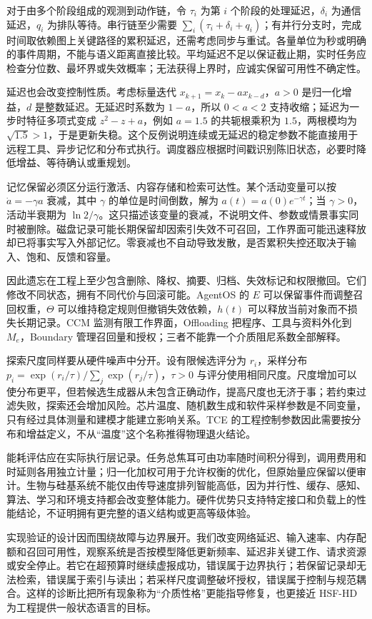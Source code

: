 对于由多个阶段组成的观测到动作链，令 $\tau_i$ 为第 $i$ 个阶段的处理延迟，$\delta_i$ 为通信延迟，$q_i$ 为排队等待。串行链至少需要 $\sum_i(\tau_i+\delta_i+q_i)$；有并行分支时，完成时间取依赖图上关键路径的累积延迟，还需考虑同步与重试。各量单位为秒或明确的事件周期，不能与语义距离直接比较。平均延迟不足以保证截止期，实时任务应检查分位数、最坏界或失效概率；无法获得上界时，应诚实保留可用性不确定性。

延迟也会改变控制性质。考虑标量迭代 $x_{k+1}=x_k-a x_{k-d}$，$a>0$ 是归一化增益，$d$ 是整数延迟。无延迟时系数为 $1-a$，所以 $0<a<2$ 支持收缩；延迟为一步时特征多项式变成 $z^2-z+a$，例如 $a=1.5$ 的共轭根乘积为 $1.5$，两根模均为 $\sqrt{1.5}>1$，于是更新失稳。这个反例说明连续或无延迟的稳定参数不能直接用于远程工具、异步记忆和分布式执行。调度器应根据时间戳识别陈旧状态，必要时降低增益、等待确认或重规划。

记忆保留必须区分运行激活、内容存储和检索可达性。某个活动变量可以按 $\dot a=-\gamma a$ 衰减，其中 $\gamma$ 的单位是时间倒数，解为 $a(t)=a(0)e^{-\gamma t}$；当 $\gamma>0$，活动半衰期为 $\ln2/\gamma$。这只描述该变量的衰减，不说明文件、参数或情景事实同时被删除。磁盘记录可能长期保留却因索引失效不可召回，工作界面可能迅速释放却已将事实写入外部记忆。零衰减也不自动导致发散，是否累积失控还取决于输入、饱和、反馈和容量。

因此遗忘在工程上至少包含删除、降权、摘要、归档、失效标记和权限撤回。它们修改不同状态，拥有不同代价与回滚可能。AgentOS 的 $E$ 可以保留事件而调整召回权重，$\Theta$ 可以维持稳定规则但撤销失效依赖，$h(t)$ 可以释放当前对象而不损失长期记录。CCM 监测有限工作界面，Offloading 把程序、工具与资料外化到 $M_e$，Boundary 管理召回量和授权；三者不能靠一个介质阻尼系数全部解释。

探索尺度同样要从硬件噪声中分开。设有限候选评分为 $r_i$，采样分布 $p_i=\exp(r_i/\tau)/\sum_j\exp(r_j/\tau)$，$\tau>0$ 与评分使用相同尺度。尺度增加可以使分布更平，但若候选生成器从未包含正确动作，提高尺度也无济于事；若约束过滤失败，探索还会增加风险。芯片温度、随机数生成和软件采样参数是不同变量，只有经过具体测量和建模才能建立影响关系。TCE 的工程控制参数因此需要按分布和增益定义，不从“温度”这个名称推得物理退火结论。

能耗评估应在实际执行层记录。任务总焦耳可由功率随时间积分得到，调用费用和时延则各用独立计量；归一化加权可用于允许权衡的优化，但原始量应保留以便审计。生物与硅基系统不能仅由传导速度排列智能高低，因为并行性、缓存、感知、算法、学习和环境支持都会改变整体能力。硬件优势只支持特定接口和负载上的性能结论，不证明拥有更完整的语义结构或更高等级体验。

实现验证的设计因而围绕故障与边界展开。我们改变网络延迟、输入速率、内存配额和召回可用性，观察系统是否按模型降低更新频率、延迟非关键工作、请求资源或安全停止。若它在超预算时继续虚报成功，错误属于边界执行；若保留记录却无法检索，错误属于索引与读出；若采样尺度调整破坏授权，错误属于控制与规范耦合。这样的诊断比把所有现象称为“介质性格”更能指导修复，也更接近 HSF-HD 为工程提供一般状态语言的目标。


